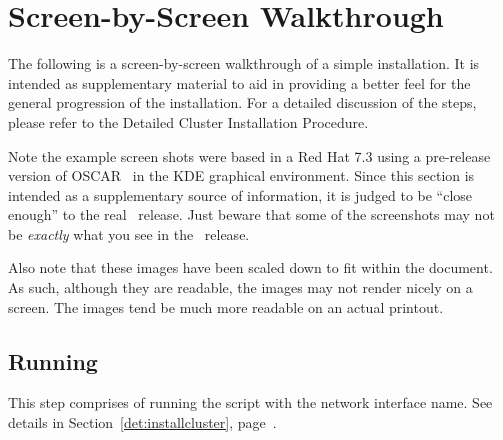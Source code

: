 %
% 
%
%
%

\newpage

\section{Screen-by-Screen Walkthrough}
\label{app:screen-by-screen}

The following is a screen-by-screen walkthrough of a simple installation.
It is intended as supplementary material to aid in providing a better feel
for the general progression of the installation.  For a detailed discussion
of the steps, please refer to the Detailed Cluster Installation Procedure. 

Note the example screen shots were based in a Red Hat 7.3 using a
pre-release version of OSCAR \oscarversion\ in the KDE graphical
environment.  Since this section is intended as a supplementary source
of information, it is judged to be ``close enough'' to the real
\oscarversion\ release.  Just beware that some of the screenshots may
not be {\em exactly} what you see in the \oscarversion\ release.

Also note that these images have been scaled down to fit within the
document.  As such, although they are readable, the images may not
render nicely on a screen.  The images tend be much more readable on
an actual printout.



\subsection{Running }

This step comprises of running the  script with
the network interface name.  See details in
Section~\ref{det:installcluster}, page~\pageref{det:installcluster}.


